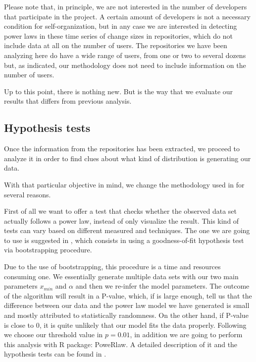 \documentclass{article}
\begin{document}
Please note that, in principle, we are not interested in the number of developers that participate in the project. A certain amount of developers is not a necessary condition for self-organization, but in any case we are interested in detecting power laws in these time series of change sizes in repositories, which do not include data at all on the number of users. The repositories we have been analyzing here do have a wide range of users, from one or two to several dozens but, as indicated, our methodology does not need to include information on the number of users.

Up to this point, there is nothing new. But is the way that we
evaluate our results that differs from previous analysis.

\subsection{Hypothesis tests}

Once the information from the repositories has been extracted, we
proceed to analyze it in order to find clues about what kind of
distribution is generating our data.

With that particular objective in mind, we change the methodology used
in \cite{merelo2017self} for several reasons.

First of all we want to offer a test that checks whether the observed
data set actually follows a power law, instead of only visualize the
result.  This kind of tests can vary based on different measured and
techniques. The one we are going to use is suggested in
\cite{clauset2009power}, which consists in using a goodness-of-fit
hypothesis test via bootstrapping procedure.

Due to the use of bootstrapping, this procedure is a time and
resources consuming one.  We essentially generate multiple data sets
with our two main parameters $x_{min}$ and $\alpha$ and then we
re-infer the model parameters. The outcome of the algorithm will
result in a P-value, which, if is large enough, tell us that the
difference between our data and the power law model we have generated
is small and mostly attributed to statistically randomness. On the
other hand, if P-value is close to 0, it is quite unlikely that our
model fits the data properly.  Following \cite{clauset2009power} we
choose our threshold value in $p=0.01$, in addition we are going to
perform this analysis with R package: PoweRlaw. A detailed description
of it and the hypothesis tests can be found in
\cite{gillespie2015power}.
\end{document}
